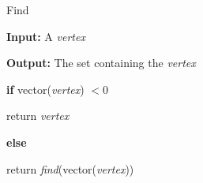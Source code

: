 \documentclass[../Head/Main.tex]{subfiles}
\begin{document}
\begin{Pseudo}{Find}{}

 \textbf{Input:} A \textit{vertex}
 
 \textbf{Output:} The set containing the \textit{vertex}
 
	\begin{Indentation}
	\item
	
	\item \textbf{if} vector(\textit{vertex}) $ < 0$
 	  \item return \textit{vertex} 
 	\item \textbf{else} 
 	  \item return \textit{find}(vector(\textit{vertex}))
	
	\end{Indentation}

\end{Pseudo} 
\end{document}
